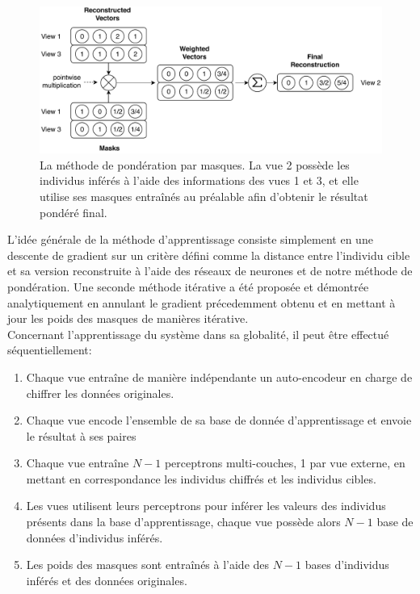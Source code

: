 \documentclass[a4paper]{article}
\begin{document}
	\begin{figure}[H]
		\centering
		\includegraphics[width=\textwidth]{img/mwm.pdf}
        \caption{La méthode de pondération par masques. La vue 2 possède les individus inférés à l'aide des informations des vues 1 et 3, et elle utilise ses masques entraînés au préalable afin d'obtenir le résultat pondéré final.}
\label{fig:sum_mwm}
	\end{figure}

    L'idée générale de la méthode d'apprentissage consiste simplement en une descente de gradient sur un critère défini comme la distance entre l'individu cible et sa version reconstruite à l'aide des réseaux de neurones et de notre méthode de pondération. Une seconde méthode itérative a été proposée et démontrée analytiquement en annulant le gradient précedemment obtenu et en mettant à jour les poids des masques de manières itérative.\\

    Concernant l'apprentissage du système dans sa globalité, il peut être effectué séquentiellement:
    \begin{enumerate}
        \item Chaque vue entraîne de manière indépendante un auto-encodeur en charge de chiffrer les données originales.
        \item Chaque vue encode l'ensemble de sa base de donnée d'apprentissage et envoie le résultat à ses paires
        \item Chaque vue entraîne $N-1$ perceptrons multi-couches, 1 par vue externe, en mettant en correspondance les individus chiffrés et les individus cibles.
        \item Les vues utilisent leurs perceptrons pour inférer les valeurs des individus présents dans la base d'apprentissage, chaque vue possède alors $N-1$ base de données d'individus inférés.
        \item Les poids des masques sont entraînés à l'aide des $N-1$ bases d'individus inférés et des données originales.\\
    \end{enumerate}
\end{document}
